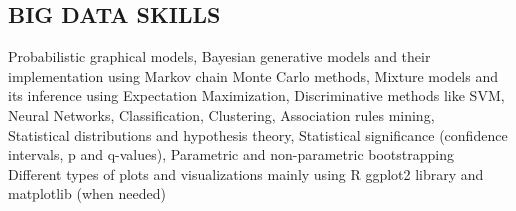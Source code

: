 \documentclass[margin, 10pt]{res} %
\begin{document}
\begin{resume}
\section{BIG DATA SKILLS}
{\bf \color{Brown}{Machine Learning Skills:}} 
Probabilistic graphical models, Bayesian generative models and their implementation using Markov chain Monte Carlo methods, Mixture models and its inference using Expectation Maximization, Discriminative methods like SVM, Neural Networks, Classification, Clustering, Association rules mining,   \\
{\bf \color{Brown}{Statistical Theory:}} Statistical distributions and hypothesis theory, Statistical significance (confidence intervals, p and q-values), Parametric and non-parametric bootstrapping \\
{\bf \color{Brown}{Statistical Visualization and reporting:}} Different types of plots and visualizations mainly using R ggplot2 library and matplotlib (when needed)



\end{resume}
\end{document}
